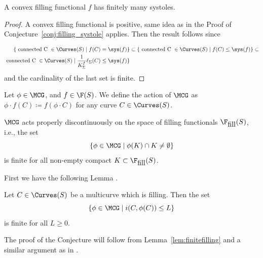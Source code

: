 \begin{conjecture}
A convex filling functional $f$ has finitely many systoles.
\end{conjecture}
\begin{proof}
A convex filling functional is positive, same idea as in the Proof of Conjecture~\ref{conj:filling_systole} applies. Then the result follows since 

\begin{align*}
  \{ \mbox{ connected C } \in \Curves(S) \mid f(C) = \sys(f) \} &\subset  \{ \mbox{ connected C } \in \Curves(S) \mid f(C) \leq \sys(f) \} \subset \\
  \mbox{ connected C } \in \Curves(S) \mid \frac{1}{K^f_{\Sigma}} \ell_{\Sigma}(C) \leq \sys(f) \}
\end{align*}
and the cardinality of the last set is finite.
\end{proof}

Let $\phi \in \MCG$, and $f \in \F(S)$.
We define the action of $\MCG$ as $\phi \cdot f(C) \coloneqq f(\phi \cdot C)$ for any curve $C \in \Curves(S)$.


\begin{conjecture}
$\MCG$ acts properly discontinuously on the space of filling functionals $\F_{\mbox{fill}}(S)$, i.e., the set
\[
 \{ \phi \in \MCG \mid \phi(K) \cap K \neq \emptyset \}
\]
is finite for all non-empty compact $K \subset \F_{\mbox{fill}}(S)$.
\label{conj:propdisc}
\end{conjecture}

First we have the following Lemma \cite[Lemma~4.3]{EM18:ErgodicGeodesicCurrents}.

\begin{lemma}
Let $C \in \Curves(S)$ be a multicurve which is filling. Then the set
\[
\{ \phi \in \MCG \mid i(C,\phi(C)) \leq L \}
\]
is finite for all $L \geq 0$.
\label{lem:finitefilling}
\end{lemma}

The proof of the Conjecture will follow from Lemma~\ref{lem:finitefilling} and a similar argument as  in \cite[Lemma~4.5]{EM18:ErgodicGeodesicCurrents}.

